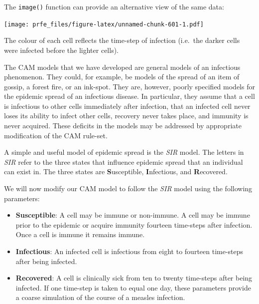 \documentclass[12pt,a4paper]{book}
\newenvironment{Shaded}{\begin{snugshade}}{\end{snugshade}}
\newcommand{\DataTypeTok}[1]{\textcolor[rgb]{0.13,0.29,0.53}{#1}}
\newcommand{\KeywordTok}[1]{\textcolor[rgb]{0.13,0.29,0.53}{\textbf{#1}}}
\newcommand{\NormalTok}[1]{#1}
\newcommand{\OperatorTok}[1]{\textcolor[rgb]{0.81,0.36,0.00}{\textbf{#1}}}
\newcommand{\OtherTok}[1]{\textcolor[rgb]{0.56,0.35,0.01}{#1}}
\theoremstyle{definition}
\theoremstyle{definition}
\theoremstyle{definition}
\theoremstyle{remark}
\begin{document}
The \texttt{image()} function can provide an alternative view of the
same data:

\begin{Shaded}
\end{Shaded}

\texttt{[image: prfe\_files/figure-latex/unnamed-chunk-601-1.pdf]}

The colour of each cell reflects the time-step of infection (i.e.~the
darker cells were infected before the lighter cells).

The CAM models that we have developed are general models of an
infectious phenomenon. They could, for example, be models of the spread
of an item of gossip, a forest fire, or an ink-spot. They are, however,
poorly specified models for the epidemic spread of an infectious
disease. In particular, they assume that a cell is infectious to other
cells immediately after infection, that an infected cell never loses its
ability to infect other cells, recovery never takes place, and immunity
is never acquired. These deficits in the models may be addressed by
appropriate modification of the CAM rule-set.

A simple and useful model of epidemic spread is the \emph{SIR} model.
The letters in \emph{SIR} refer to the three states that influence
epidemic spread that an individual can exist in. The three states are
\textbf{S}usceptible, \textbf{I}nfectious, and \textbf{R}ecovered.

We will now modify our CAM model to follow the \emph{SIR} model using
the following parameters:

\begin{itemize}
\item
  \textbf{Susceptible}: A cell may be immune or non-immune. A cell may
  be immune prior to the epidemic or acquire immunity fourteen
  time-steps after infection. Once a cell is immune it remains immune.
\item
  \textbf{Infectious}: An infected cell is infectious from eight to
  fourteen time-steps after being infected.
\item
  \textbf{Recovered}: A cell is clinically sick from ten to twenty
  time-steps after being infected. If one time-step is taken to equal
  one day, these parameters provide a coarse simulation of the course of
  a measles infection.
\end{itemize}
\end{document}
